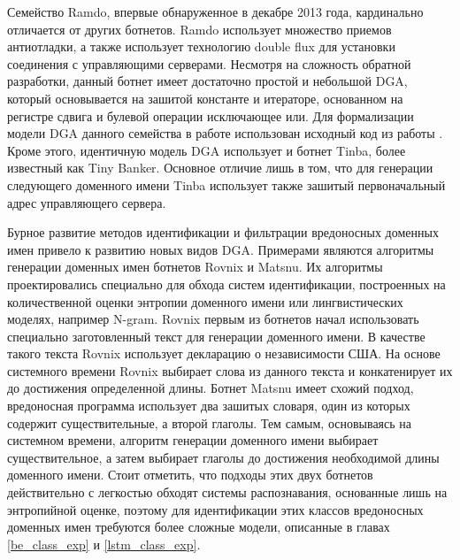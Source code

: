 Семейство Ramdo, впервые обнаруженное в декабре 2013 года, кардинально отличается от других ботнетов. Ramdo использует множество приемов антиотладки, а также использует технологию double flux для установки соединения с управляющими серверами. Несмотря на сложность обратной разработки, данный ботнет имеет достаточно простой и небольшой DGA, который основывается на зашитой константе и итераторе, основанном на регистре сдвига и булевой операции исключающее или. Для формализации модели DGA данного семейства в работе использован исходный код из работы \cite{Behind}. Кроме этого, идентичную модель DGA использует и ботнет Tinba, более известный как Tiny Banker. Основное отличие лишь в том, что для генерации следующего доменного имени Tinba использует также зашитый первоначальный адрес управляющего сервера.

Бурное развитие методов идентификации и фильтрации вредоносных доменных имен привело к развитию новых видов DGA. Примерами являются алгоритмы генерации доменных имен ботнетов Rovnix и Matsnu. Их алгоритмы проектировались специально для обхода систем идентификации, построенных на количественной оценки энтропии доменного имени или лингвистических моделях, например N-gram. Rovnix первым из ботнетов начал использовать специально заготовленный текст для генерации доменного имени. В качестве такого текста Rovnix использует декларацию о независимости США. На основе системного времени Rovnix выбирает слова из данного текста и конкатенирует их до достижения определенной длины. Ботнет Matsnu имеет схожий подход, вредоносная программа использует два зашитых словаря, один из которых содержит существительные, а второй глаголы. Тем самым, основываясь на системном времени, алгоритм генерации доменного имени выбирает существительное, а затем выбирает глаголы до достижения необходимой длины доменного имени. Стоит отметить, что подходы этих двух ботнетов действительно с легкостью обходят системы распознавания, основанные лишь на энтропийной оценке, поэтому для идентификации этих классов вредоносных доменных имен требуются более сложные модели, описанные в главах \ref{be_class_exp} и \ref{lstm_class_exp}.
\clearpage

